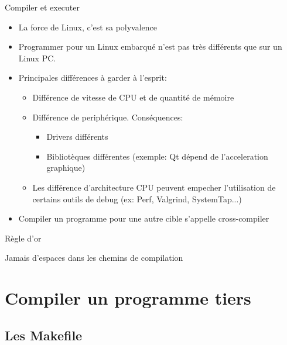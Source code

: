 \begin{frame}{Compiler et executer}
  \begin{itemize}
  \item La force de Linux, c'est sa polyvalence
  \item Programmer  pour un Linux  embarqué n'est pas  très différents
    que sur un Linux PC.
  \item Principales différences à garder à l'esprit:
    \begin{itemize}
    \item Différence de vitesse de CPU et de quantité de mémoire
    \item Différence de periphérique. Conséquences:
      \begin{itemize}
      \item Drivers différents
      \item   Bibliotèques   différentes   (exemple:  Qt   dépend   de
        l'acceleration graphique)
      \end{itemize}
    \item   Les  différence   d'architecture   CPU  peuvent   empecher
      l'utilisation de  certains outils de debug  (ex: Perf, Valgrind,
      SystemTap...)
    \end{itemize}
  \item  Compiler   un  programme  pour  une   autre  cible  s'appelle
    cross-compiler
  \end{itemize}
\end{frame}

\begin{frame}[fragile=singleslide]{Règle d'or}
  \begin{center}
    \huge{Jamais d'espaces dans les chemins de compilation}
  \end{center}
\end{frame}

\section{Compiler un programme tiers}

\subsection{Les Makefile}

